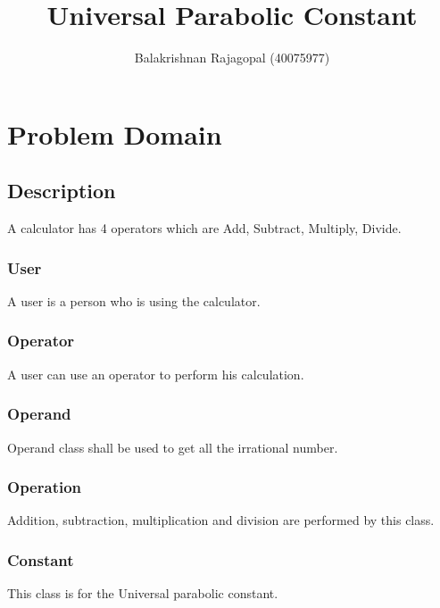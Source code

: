 \documentclass{report}
\title{Universal Parabolic Constant}
\author{Balakrishnan Rajagopal (40075977) }
\date{}
\begin{document}
\maketitle


\newpage
\chapter{Problem Domain}

\newpage
\section{Description}
A calculator has 4 operators which are Add, Subtract, Multiply, Divide.
\subsection{User}
A user is a person who is using the calculator.
\subsection{Operator}
A user can use an operator to perform his calculation.\newline

\subsection{Operand}
Operand class shall be used to get all the irrational number. 
\subsection{Operation}
Addition, subtraction, multiplication and division are performed by this class.

\subsection{Constant}This class is for the Universal parabolic constant.




\end{document}
